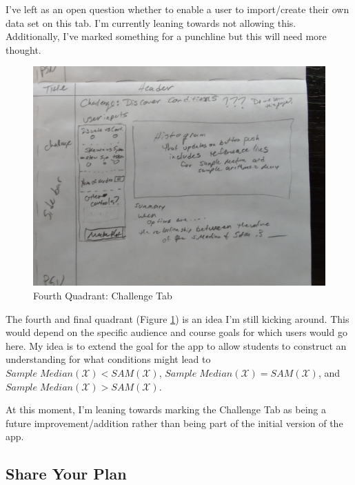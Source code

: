 \documentclass[
]{book}
\begin{document}
I've left as an open question whether to enable a user to import/create their own data set on this tab. I'm currently leaning towards not allowing this. Additionally, I've marked something for a punchline but this will need more thought.

\begin{figure}

{\centering \includegraphics[width=22.22in]{images/planSketches/planSketch5-Challenge} 

}

\caption{Fourth Quadrant: Challenge Tab}\label{fig:planSketchChallenge}
\end{figure}

The fourth and final quadrant (Figure \ref{fig:planSketchChallenge}) is an idea I'm still kicking around. This would depend on the specific audience and course goals for which users would go here. My idea is to extend the goal for the app to allow students to construct an understanding for what conditions might lead to \(Sample\;Median\left(\mathcal{X}\right)<SAM\left(\mathcal{X}\right)\), \(Sample\;Median\left(\mathcal{X}\right)=SAM\left(\mathcal{X}\right)\), and \(Sample\;Median\left(\mathcal{X}\right)>SAM\left(\mathcal{X}\right)\).

At this moment, I'm leaning towards marking the Challenge Tab as being a future improvement/addition rather than being part of the initial version of the app.

\hypertarget{share-your-plan}{%
\subsection{Share Your Plan}\label{share-your-plan}}
\end{document}
